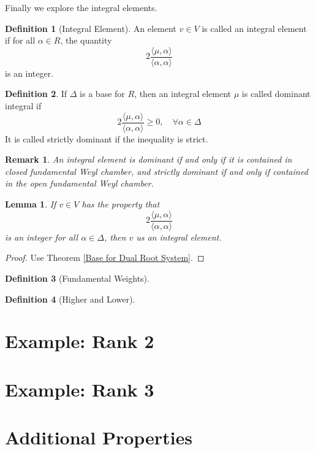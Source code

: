 \documentclass{article}
\newtheorem{lemma}{Lemma}[section]
\newtheorem*{remark}{Remark}
\theoremstyle{definition}
\newtheorem{definition}{Definition}[section]
\begin{document}
Finally we explore the integral elements.
\begin{definition}[Integral Element]
    An element $v\in V$ is called an integral element if for all $\alpha\in R$, the quantity 
    \[2\frac{\langle\mu,\alpha\rangle}{\langle\alpha,\alpha\rangle}\] 
    is an integer.
\end{definition}
\begin{definition}
    If $\Delta$ is a base for $R$, then an integral element $\mu$ is called dominant integral if 
    \[ 2\frac{\langle\mu,\alpha\rangle}{\langle\alpha,\alpha\rangle}\ge 0,\quad\forall \alpha\in\Delta\] 
    It is called strictly dominant if the inequality is strict.
\end{definition}
\begin{remark}
    An integral element is dominant if and only if it is contained in closed fundamental Weyl chamber,
    and strictly dominant if and only if contained in the open fundamental Weyl chamber.
\end{remark}
\begin{lemma}
    If $v\in V$ has the property that \[2\frac{\langle\mu,\alpha\rangle}{\langle\alpha,\alpha\rangle}\] 
    is an integer for all $\alpha\in \Delta$, then $v$ us an integral element.
\end{lemma}
\begin{proof}
    Use Theorem \ref{Base for Dual Root System}.
\end{proof}

\begin{definition}[Fundamental Weights]
    
\end{definition}


\begin{definition}[Higher and Lower]
    
\end{definition}
\section{Example: Rank 2}





\section{Example: Rank 3}





\section{Additional Properties}
\end{document}
